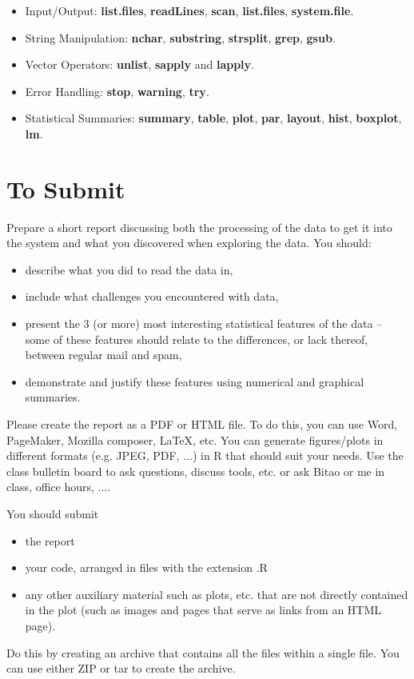 \documentclass[10pt]{article}
\def\TA{Bitao}
\def\SFunctionRef#1{\textbf{#1}}
\begin{document}
\begin{itemize}
\item Input/Output: \SFunctionRef{list.files},
\SFunctionRef{readLines},
\SFunctionRef{scan},
\SFunctionRef{list.files},
\SFunctionRef{system.file}.
\item String Manipulation:
\SFunctionRef{nchar},
\SFunctionRef{substring},
\SFunctionRef{strsplit},
\SFunctionRef{grep},
\SFunctionRef{gsub}.
\item Vector Operators:
\SFunctionRef{unlist}, \SFunctionRef{sapply} and \SFunctionRef{lapply}.
\item Error Handling:
 \SFunctionRef{stop}, \SFunctionRef{warning},
\SFunctionRef{try}.
\item Statistical Summaries:
\SFunctionRef{summary},
\SFunctionRef{table},
\SFunctionRef{plot},
\SFunctionRef{par},
\SFunctionRef{layout},
\SFunctionRef{hist},
\SFunctionRef{boxplot},
\SFunctionRef{lm}.

\end{itemize}


\section{To Submit}
Prepare a short report discussing both the processing of the data to
get it into the system and what you discovered when exploring the
data. You should: 
\begin{itemize}
\item
  describe what you did to read the data in,
\item
  include what challenges you encountered with data, 
\item
  present the 3 (or more) most interesting statistical features of the data --
  some of these features should relate to the differences, or lack
  thereof, between  regular mail and spam,
\item
  demonstrate and justify these features using
  numerical and graphical summaries.
\end{itemize}

Please create the report as a PDF or HTML file. To do this, you can
use Word, PageMaker, Mozilla composer, LaTeX, etc.  You can generate
figures/plots in different formats (e.g. JPEG, PDF, $\ldots$) in R
that should suit your needs.  Use the class bulletin board to ask
questions, discuss tools, etc. or ask \TA{} or me in class, office
hours, $\ldots$.

You should submit 
\begin{itemize}
\item the report
\item your code, arranged in files with the extension .R
\item any other auxiliary material such as plots, etc.
  that are not directly  contained in the plot
  (such as images and pages that serve as links from an HTML page).
\end{itemize}
Do this by creating an archive that contains all the files within a
single file.  You can use either ZIP or tar to create the archive.
\end{document}
